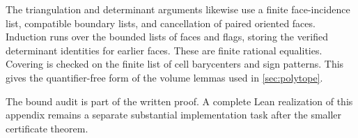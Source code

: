 The triangulation and determinant arguments
likewise use a finite face-incidence list,
compatible boundary lists, and cancellation
of paired oriented faces.
Induction runs over the bounded lists of
faces and flags, storing the verified
determinant identities for earlier faces.
These are finite rational equalities.
Covering is checked on the finite list of
cell barycenters and sign patterns.
This gives the quantifier-free form of the
volume lemmas used in \cref{sec:polytope}.

The bound audit is part of the written proof.
A complete Lean realization of this appendix
remains a separate substantial implementation
task after the smaller certificate theorem.
